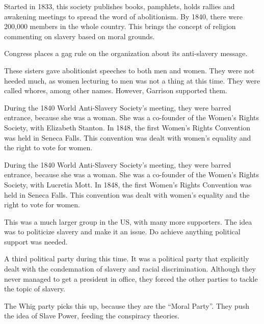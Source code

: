 \begin{description}
\begin{description}[noitemsep]
  \item[American Anti-Slavery Society] Started in 1833, this society publishes books, pamphlets, holds rallies and awakening meetings to spread the word of abolitionism.
    By 1840, there were 200,000 members in the whole country.
    This brings the concept of religion commenting on slavery based on moral grounds.

    Congress places a gag rule on the organization about its anti-slavery message.

  \item[Angelina and Sarah Grimke] These sisters gave abolitionist speeches to both men and women.
    They were not heeded much, as women lecturing to men was not a thing at this time.
    They were called whores, among other names.
    However, Garrison supported them.

  \item[Lucretia Mott] During the 1840 World Anti-Slavery Society's meeting, they were barred entrance, because she was a woman.
    She was a co-founder of the Women's Rights Society, with Elizabeth Stanton.
    In 1848, the first Women's Rights Convention was held in Seneca Falls.
    This convention was dealt with women's equality and the right to vote for women.
  \item[Elizabeth Cady Stanton] During the 1840 World Anti-Slavery Society's meeting, they were barred entrance, because she was a woman.
    She was a co-founder of the Women's Rights Society, with Lucretia Mott.
    In 1848, the first Women's Rights Convention was held in Seneca Falls.
    This convention was dealt with women's equality and the right to vote for women.
  \end{description}

\item[Political Anti-Slavery] This was a much larger group in the US, with many more supporters.
  The idea was to politicize slavery and make it an issue.
  Do achieve anything political support was needed.

\item[Liberty Party] A third political party during this time.
  It was a political party that explicitly dealt with the condemnation of slavery and racial discrimination.
  Although they never managed to get a president in office, they forced the other parties to tackle the topic of slavery.

  The Whig party picks this up, because they are the ``Moral Party''.
  They push the idea of Slave Power, feeding the conspiracy theories.


\end{description}
